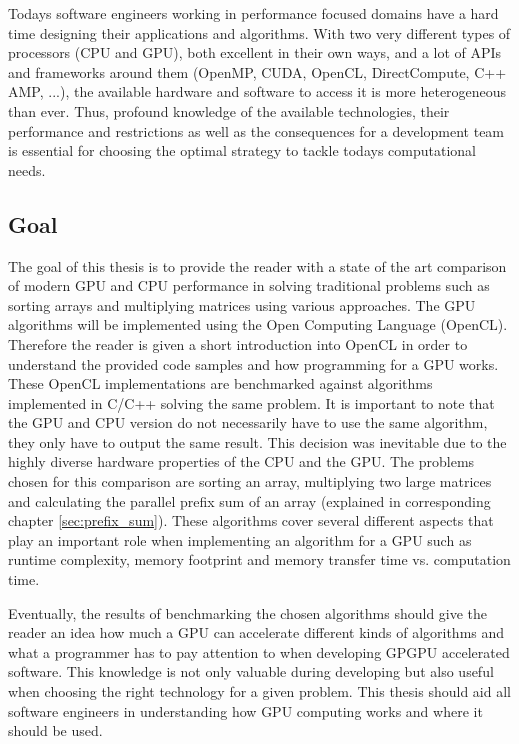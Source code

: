 Todays software engineers working in performance focused domains have a hard time designing their applications and algorithms. With two very different types of processors (CPU and GPU), both excellent in their own ways, and a lot of APIs and frameworks around them (OpenMP, CUDA, OpenCL, DirectCompute, C++ AMP, ...), the available hardware and software to access it is more heterogeneous than ever. Thus, profound knowledge of the available technologies, their performance and restrictions as well as the consequences for a development team is essential for choosing the optimal strategy to tackle todays computational needs.

\subsection{Goal}
The goal of this thesis is to provide the reader with a state of the art comparison of modern GPU and CPU performance in solving traditional problems such as sorting arrays and multiplying matrices using various approaches.
The GPU algorithms will be implemented using the Open Computing Language (OpenCL). Therefore the reader is given a short introduction into OpenCL in order to understand the provided code samples and how programming for a GPU works. These OpenCL implementations are benchmarked against algorithms implemented in C/C++ solving the same problem. It is important to note that the GPU and CPU version do not necessarily have to use the same algorithm, they only have to output the same result. This decision was inevitable due to the highly diverse hardware properties of the CPU and the GPU.
The problems chosen for this comparison are sorting an array, multiplying two large matrices and calculating the parallel prefix sum of an array (explained in corresponding chapter \ref{sec:prefix_sum}). These algorithms cover several different aspects that play an important role when implementing an algorithm for a GPU such as runtime complexity, memory footprint and memory transfer time vs. computation time. 

Eventually, the results of benchmarking the chosen algorithms should give the reader an idea how much a GPU can accelerate different kinds of algorithms and what a programmer has to pay attention to when developing GPGPU accelerated software. This knowledge is not only valuable during developing but also useful when choosing the right technology for a given problem. This thesis should aid all software engineers in understanding how GPU computing works and where it should be used.

